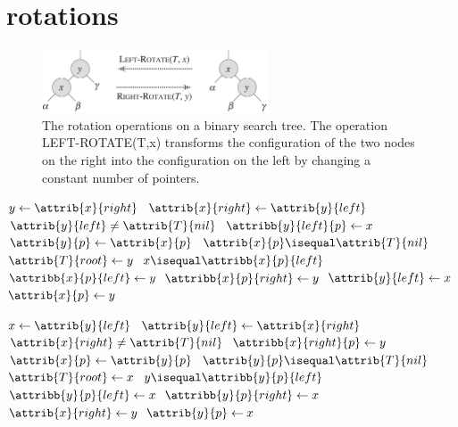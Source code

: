 \documentclass[UTF8,11pt,openany]{ctexbook}
\begin{document}
\newpage 
\section{rotations}

\begin{figure}[h] %
	\centering %
	\includegraphics[width=0.6\textwidth]{rb-rotate.png} %
	\caption{The rotation operations on a binary search tree. The operation LEFT-ROTATE(T,x) transforms the configuration of the two nodes on the right into the configuration on the left by changing a constant number of pointers.
	} %
	\label{red_black_tree_sample1} %
\end{figure}%
 
\begin{codebox}
	\li    $ y \gets \attrib{x}{right} $
	\li    $ \attrib{x}{right} \gets \attrib{y}{left}  $ 
	\li    \If $\attrib{y}{left} \ne \attrib{T}{nil}$
	\li        \Then   $\attribb{y}{left}{p} \gets x$
		   \End
    \li    $ \attrib{y}{p} \gets \attrib{x}{p} $
	\li    \If  $\attrib{x}{p} \isequal \attrib{T}{nil}$
	\li        \Then    $\attrib{T}{root} \gets y$
	\li    \ElseIf   $ x \isequal \attribb{x}{p}{left}$
	\li        \Then $ \attribb{x}{p}{left} \gets y$
	\li    \Else  $ \attribb{x}{p}{right} \gets y$
	       \End
	\li    $\attrib{y}{left} \gets x$
	\li    $ \attrib{x}{p} \gets y $
\end{codebox}
 
\begin{codebox}
	\li    $ x \gets \attrib{y}{left} $
	\li    $ \attrib{y}{left} \gets \attrib{x}{right}  $ 
	\li    \If $\attrib{x}{right} \ne \attrib{T}{nil}$
	\li        \Then   $\attribb{x}{right}{p} \gets y$
	       \End
	\li    $ \attrib{x}{p} \gets \attrib{y}{p} $
	\li    \If  $\attrib{y}{p} \isequal \attrib{T}{nil}$
	\li        \Then    $\attrib{T}{root} \gets x$
	\li    \ElseIf   $ y \isequal \attribb{y}{p}{left}$
	\li        \Then $ \attribb{y}{p}{left} \gets x$
	\li    \Else  $ \attribb{y}{p}{right} \gets x$
	\End
	\li    $\attrib{x}{right} \gets y$
	\li    $ \attrib{y}{p} \gets x $
\end{codebox}
\end{document}
